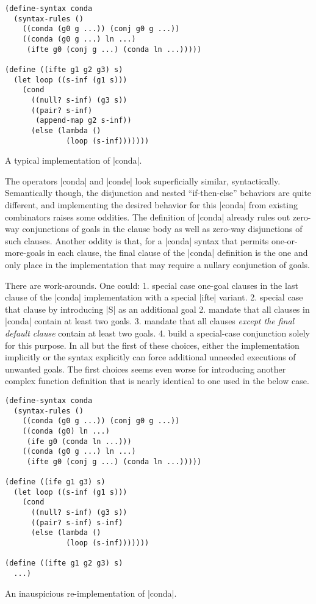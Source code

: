 \documentclass[sigplan,screen,draft,anonymous,review,natbib=false]{acmart}
\begin{document}
\begin{listing}
  \begin{verbatim}
(define-syntax conda
  (syntax-rules ()
    ((conda (g0 g ...)) (conj g0 g ...))
    ((conda (g0 g ...) ln ...)
     (ifte g0 (conj g ...) (conda ln ...)))))

(define ((ifte g1 g2 g3) s)
  (let loop ((s-inf (g1 s)))
    (cond
      ((null? s-inf) (g3 s))
      ((pair? s-inf)
       (append-map g2 s-inf))
      (else (lambda ()
              (loop (s-inf)))))))
  \end{verbatim}
  \caption{A typical implementation of \rackinline|conda|.}
  \label{mnt:conda-implementation}
\end{listing}

The operators \rackinline|conda| and \rackinline|conde| look
superficially similar, syntactically. Semantically though, the
disjunction and nested \enquote{if-then-else} behaviors are quite
different, and implementing the desired behavior for this
\rackinline|conda| from existing combinators raises some oddities. The
definition of \rackinline|conda| already rules out zero-way
conjunctions of goals in the clause body as well as zero-way
disjunctions of such clauses. Another oddity is that, for a
\rackinline|conda| syntax that permits one-or-more-goals in each
clause, the final clause of the \rackinline|conda| definition is the
one and only place in the implementation that may require a nullary
conjunction of goals.

There are work-arounds. One could: 1. special case one-goal clauses in
the last clause of the \rackinline|conda| implementation with a
special \rackinline|ifte| variant. 2. special case that clause by
introducing \rackinline|S| as an additional goal 2. mandate that all
clauses in \rackinline|conda| contain at least two goals. 3. mandate
that all clauses \emph{except the final default clause} contain at
least two goals. 4. build a special-case conjunction solely for this
purpose. In all but the first of these choices, either the
implementation implicitly or the syntax explicitly can force
additional unneeded executions of unwanted goals. The first choices
seems even worse for introducing another complex function definition
that is nearly identical to one used in the below case.

\begin{listing}
  \begin{verbatim}
(define-syntax conda
  (syntax-rules ()
    ((conda (g0 g ...)) (conj g0 g ...))
    ((conda (g0) ln ...)
     (ife g0 (conda ln ...)))
    ((conda (g0 g ...) ln ...)
     (ifte g0 (conj g ...) (conda ln ...)))))

(define ((ife g1 g3) s)
  (let loop ((s-inf (g1 s)))
    (cond
      ((null? s-inf) (g3 s))
      ((pair? s-inf) s-inf)
      (else (lambda ()
              (loop (s-inf)))))))

(define ((ifte g1 g2 g3) s)
  ...)
  \end{verbatim}
  \caption{An inauspicious re-implementation of \rackinline|conda|.}
  \label{mnt:conda-bad-re-implementation}
\end{listing}
\end{document}

